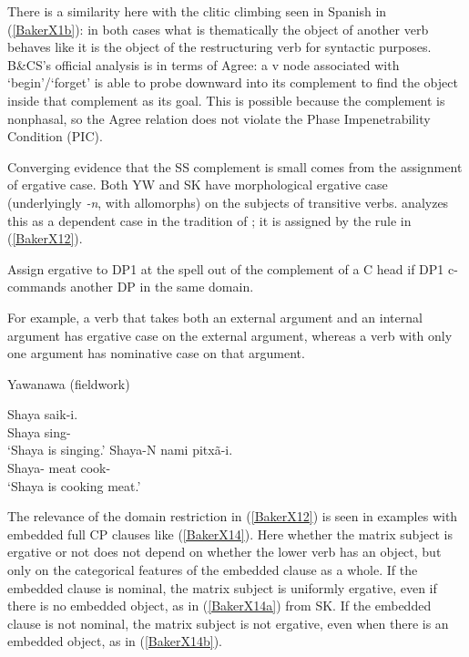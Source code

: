 \documentclass[output=paper]{langscibook}
\begin{document}
There is a similarity here with the clitic climbing seen in Spanish in (\ref{BakerX1b}): in both cases what is thematically the object of another verb behaves like it is the object of the restructuring verb for syntactic purposes. B\&CS’s official analysis is in terms of Agree: a v node associated with ‘begin’/‘forget’ is able to probe downward into its complement to find the object inside that complement as its goal. This is possible because the complement is nonphasal, so the Agree relation does not violate the Phase Impenetrability Condition (PIC).

Converging evidence that the SS complement is small comes from the assignment of ergative case. Both YW and SK have morphological ergative case (underlyingly \textit{-n}, with allomorphs) on the subjects of transitive verbs. \citet{Baker2014} analyzes this as a dependent case in the tradition of \citet{Marantz1991}; it is assigned by the rule in (\ref{BakerX12}).

\begin{exe}
    \ex \label{BakerX12} Assign ergative to DP1 at the spell out of the complement of a C head if DP1 c-commands another DP in the same domain.
\end{exe}

For example, a verb that takes both an external argument and an internal argument has ergative case on the external argument, whereas a verb with only one argument has nominative case on that argument.

\begin{exe}
\ex Yawanawa (fieldwork) \label{BakerX13}
    \begin{xlist}
    \ex \label{BakerX13a}
		\gll Shaya saik-i.\\
			 Shaya sing-\\
		    \glt `Shaya is singing.'
	\ex \label{BakerX13b}
		\gll Shaya-N nami pitxã-i.\\
			 Shaya- meat cook-\\
		    \glt `Shaya is cooking meat.'
    \end{xlist}
\end{exe}

The relevance of the domain restriction in (\ref{BakerX12}) is seen in examples with embedded full CP clauses like (\ref{BakerX14}). Here whether the matrix subject is ergative or not does not depend on whether the lower verb has an object, but only on the categorical features of the embedded clause as a whole. If the embedded clause is nominal, the matrix subject is uniformly ergative, even if there is no embedded object, as in (\ref{BakerX14a}) from SK. If the embedded clause is not nominal, the matrix subject is not ergative, even when there is an embedded object, as in (\ref{BakerX14b}).
\end{document}
